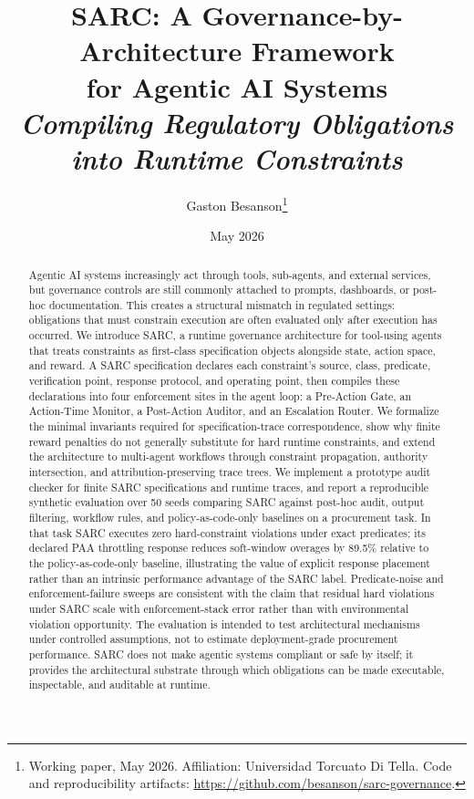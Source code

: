 \documentclass[11pt,a4paper]{article}
\title{\vspace{-1.5em}\color{accent}\textbf{SARC: A Governance-by-Architecture Framework\\ for Agentic AI Systems}\\[0.3em]\large\textit{Compiling Regulatory Obligations into Runtime Constraints}}
\author{Gaston Besanson\thanks{Working paper, May 2026. Affiliation: Universidad Torcuato Di Tella. Code and reproducibility artifacts: \url{https://github.com/besanson/sarc-governance}.}}
\date{May 2026}
\theoremstyle{remark}
\begin{document}
\maketitle

\begin{abstract}
\noindent Agentic AI systems increasingly act through tools, sub-agents, and external services, but governance controls are still commonly attached to prompts, dashboards, or post-hoc documentation. This creates a structural mismatch in regulated settings: obligations that must constrain execution are often evaluated only after execution has occurred. We introduce SARC, a runtime governance architecture for tool-using agents that treats constraints as first-class specification objects alongside state, action space, and reward. A SARC specification declares each constraint's source, class, predicate, verification point, response protocol, and operating point, then compiles these declarations into four enforcement sites in the agent loop: a Pre-Action Gate, an Action-Time Monitor, a Post-Action Auditor, and an Escalation Router. We formalize the minimal invariants required for specification-trace correspondence, show why finite reward penalties do not generally substitute for hard runtime constraints, and extend the architecture to multi-agent workflows through constraint propagation, authority intersection, and attribution-preserving trace trees. We implement a prototype audit checker for finite SARC specifications and runtime traces, and report a reproducible synthetic evaluation over 50 seeds comparing SARC against post-hoc audit, output filtering, workflow rules, and policy-as-code-only baselines on a procurement task. In that task SARC executes zero hard-constraint violations under exact predicates; its declared PAA throttling response reduces soft-window overages by 89.5\% relative to the policy-as-code-only baseline, illustrating the value of explicit response placement rather than an intrinsic performance advantage of the SARC label. Predicate-noise and enforcement-failure sweeps are consistent with the claim that residual hard violations under SARC scale with enforcement-stack error rather than with environmental violation opportunity. The evaluation is intended to test architectural mechanisms under controlled assumptions, not to estimate deployment-grade procurement performance. SARC does not make agentic systems compliant or safe by itself; it provides the architectural substrate through which obligations can be made executable, inspectable, and auditable at runtime.
\end{abstract}
\end{document}
